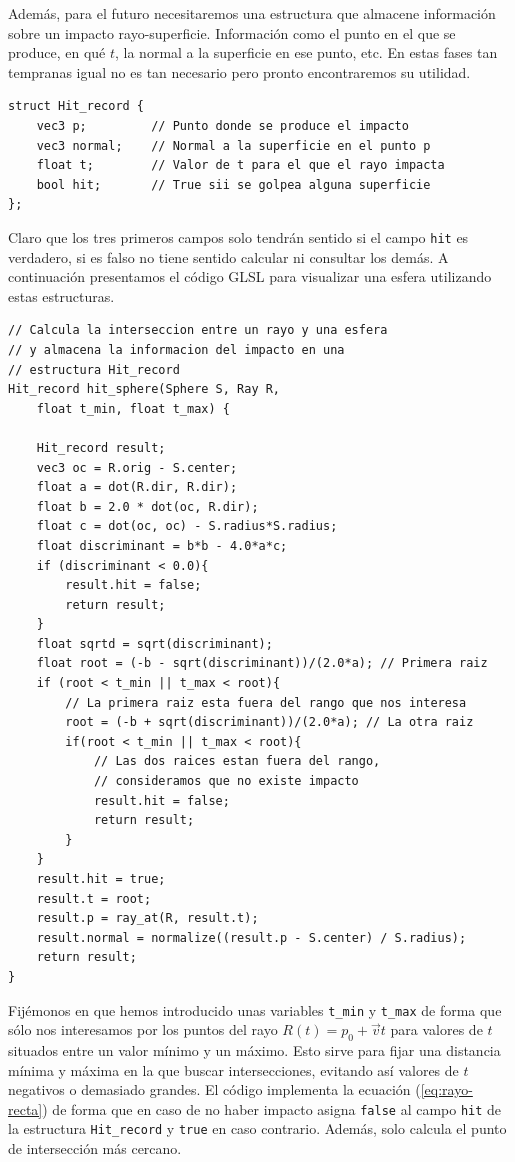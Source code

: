 Además, para el futuro necesitaremos una estructura que almacene información sobre un impacto rayo-superficie. Información como el punto en el que se produce, en qué $t$, la normal a la superficie en ese punto, etc. En estas fases tan tempranas igual no es tan necesario pero pronto encontraremos su utilidad.

\begin{lstlisting}
struct Hit_record {
    vec3 p;         // Punto donde se produce el impacto
    vec3 normal;    // Normal a la superficie en el punto p
    float t;        // Valor de t para el que el rayo impacta
    bool hit;       // True sii se golpea alguna superficie
};
\end{lstlisting}

Claro que los tres primeros campos solo tendrán sentido si el campo \verb|hit| es verdadero, si es falso no tiene sentido calcular ni consultar los demás. A continuación presentamos el código GLSL para visualizar una esfera utilizando estas estructuras.

\begin{lstlisting}
// Calcula la interseccion entre un rayo y una esfera
// y almacena la informacion del impacto en una
// estructura Hit_record
Hit_record hit_sphere(Sphere S, Ray R, 
    float t_min, float t_max) {

    Hit_record result;
    vec3 oc = R.orig - S.center;
    float a = dot(R.dir, R.dir);
    float b = 2.0 * dot(oc, R.dir);
    float c = dot(oc, oc) - S.radius*S.radius;
    float discriminant = b*b - 4.0*a*c;
    if (discriminant < 0.0){
        result.hit = false;
        return result;
    }
    float sqrtd = sqrt(discriminant);
    float root = (-b - sqrt(discriminant))/(2.0*a); // Primera raiz
    if (root < t_min || t_max < root){ 
        // La primera raiz esta fuera del rango que nos interesa
        root = (-b + sqrt(discriminant))/(2.0*a); // La otra raiz
        if(root < t_min || t_max < root){ 
            // Las dos raices estan fuera del rango,
            // consideramos que no existe impacto
            result.hit = false;
            return result;
        }
    } 
    result.hit = true;
    result.t = root;
    result.p = ray_at(R, result.t);
    result.normal = normalize((result.p - S.center) / S.radius);
    return result;
}
\end{lstlisting}

Fijémonos en que hemos introducido unas variables \verb|t_min| y \verb|t_max| de forma que sólo nos interesamos por los puntos del rayo $R(t)=p_0+\vec vt$ para valores de $t$ situados entre un valor mínimo y un máximo. Esto sirve para fijar una distancia mínima y máxima en la que buscar intersecciones, evitando así valores de $t$ negativos o demasiado grandes. El código implementa la ecuación (\ref{eq:rayo-recta}) de forma que en caso de no haber impacto asigna \verb|false| al campo \verb|hit| de la estructura \verb|Hit_record| y \verb|true| en caso contrario. Además, solo calcula el punto de intersección más cercano.

